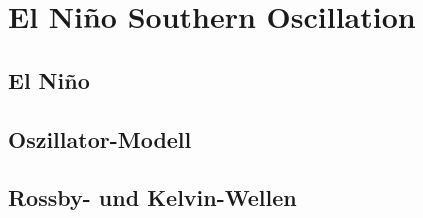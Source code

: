 %
%
%
\chapter{El Niño Southern Oscillation}

\section{El Niño}

\section{Oszillator-Modell}

\section{Rossby- und Kelvin-Wellen}

